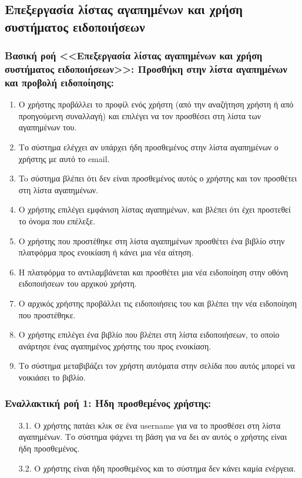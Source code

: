 \documentclass[12pt,a4paper]{article}
\begin{document}
\subsection{Επεξεργασία λίστας αγαπημένων και χρήση \\συστήματος ειδοποιήσεων}

\subsubsection*{Βασική ροή <<Επεξεργασία λίστας αγαπημένων και χρήση συστήματος ειδοποιήσεων>>: Προσθήκη στην λίστα αγαπημένων και προβολή ειδοποίησης:}
\begin{enumerate}
    \item Ο χρήστης προβάλλει το προφίλ ενός χρήστη (από την αναζήτηση χρήστη ή από προηγούμενη συναλλαγή) και επιλέγει να τον προσθέσει στη λίστα των αγαπημένων του.
    \item Το σύστημα ελέγχει αν υπάρχει ήδη προσθεμένος στην λίστα αγαπημένων ο χρήστης με αυτό το email.
    \item To σύστημα βλέπει ότι δεν είναι προσθεμένος αυτός ο χρήστης και τον προσθέτει στη λίστα αγαπημένων.
    \item Ο χρήστης επιλέγει εμφάνιση λίστας αγαπημένων, και βλέπει ότι έχει προστεθεί το όνομα που επέλεξε.
    \item Ο χρήστης που προστέθηκε στη λίστα αγαπημένων προσθέτει ένα βιβλίο στην πλατφόρμα προς ενοικίαση ή κάνει μια νέα αίτηση.
    \item Η πλατφόρμα το αντιλαμβάνεται και προσθέτει μια νέα ειδοποίηση στην οθόνη ειδοποιήσεων του αρχικού χρήστη.
    \item Ο αρχικός χρήστης προβάλλει τις ειδοποιήσεις του και βλέπει την νέα ειδοποίηση που προστέθηκε.
    \item Ο χρήστης επιλέγει ένα βιβλίο που βλέπει στη λίστα ειδοποιήσεων, το οποίο ανάρτησε ένας αγαπημένος χρήστης του προς ενοικίαση.
    \item Το σύστημα μεταβιβάζει τον χρήστη αυτόματα στην σελίδα που αυτός μπορεί να νοικιάσει το βιβλίο.
\end{enumerate}

\subsubsection*{Εναλλακτική ροή 1: Ήδη προσθεμένος χρήστης:}
\begin{enumerate}
    \item [3.1.] Ο χρήστης πατάει κλικ σε ένα username για να το προσθέσει στη λίστα αγαπημένων. Το σύστημα ψάχνει τη βάση για να δει αν αυτός ο χρήστης είναι ήδη προσθεμένος.
    \item [3.2.] Ο χρήστης είναι ήδη προσθεμένος και το σύστημα δεν κάνει καμία ενέργεια.
\end{enumerate}
\end{document}
